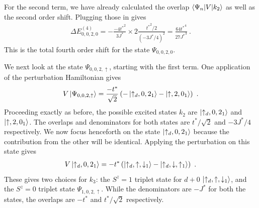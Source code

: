 For the second term, we have already calculated the overlap \(\braket{\Psi_n | V | k_2}\) as well as the second order shift. Plugging those in gives
\begin{equation}\begin{aligned}
	\Delta E^{(4)}_{0,0,2,0} = - \frac{-4{t^*}^2}{3J^*} \times 2\frac{{t^*}^2/2}{(-3J^*/4)^2} = \frac{64{t^*}^4}{27{J^*}^3}~.
\end{aligned}\end{equation}
This is the total fourth order shift for the state \(\Psi_{0,0,2,0}\).

We next look at the state \(\Psi_{0,0,2,\uparrow}\), starting with the first term. One application of the perturbation Hamiltonian gives
\begin{equation}\begin{aligned}
	V\ket{\Psi_{0,0,2,\uparrow}} = \frac{-t^*}{\sqrt 2}\left(-\ket{\uparrow_d,0,2_1} - \ket{\uparrow,2,0_1}\right)~.
\end{aligned}\end{equation}
Proceeding exactly as before, the possible excited states \(k_2\) are \(\ket{\uparrow_d,0,2_1}\) and \(\ket{\uparrow,2,0_1}\). The overlaps and denominators for both states are \(t^*/\sqrt 2\) and \(-3J^*/4\) respectively. We now focus henceforth on the state \(\ket{\uparrow_d,0,2_1}\) because the contribution from the other will be identical. Applying the perturbation on this state gives
\begin{equation}\begin{aligned}
	V\ket{\uparrow_d,0,2_1} = -t^* \left(\ket{\uparrow_d,\uparrow,\downarrow_1} - \ket{\uparrow_d,\downarrow,\uparrow_1}\right)~.
\end{aligned}\end{equation}
These gives two choices for \(k_3\): the \(S^z=1\) triplet state for \(d+0\) \(\ket{\uparrow_d,\uparrow,\downarrow_1}\), and the \(S^z=0\) triplet state \(\Psi_{1,0,2,\uparrow}\). While the denominators are \(-J^*\) for both the states, the overlaps are \(-t^*\) and \(t^*/\sqrt 2\) respectively. 


